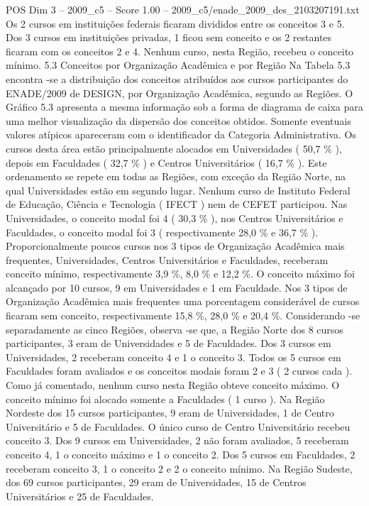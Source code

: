 \begin{textsample}{POS Dim 3 – 2009\_c5 – Score 1.00 – 2009\_c5/enade\_2009\_des\_2103207191.txt}
Os 2 cursos em instituições federais ficaram divididos entre os conceitos 3 e 5.
Dos 3 cursos em instituições privadas, 1 ficou sem conceito e os 2 restantes ficaram com os conceitos 2 e 4.
Nenhum curso, nesta Região, recebeu o conceito mínimo. 5.3 Conceitos por Organização Acadêmica e por Região Na Tabela 5.3 encontra -se a distribuição dos conceitos atribuídos aos cursos participantes do ENADE/2009 de DESIGN, por Organização Acadêmica, segundo as Regiões.
O Gráfico 5.3 apresenta a mesma informação sob a forma de diagrama de caixa para uma melhor visualização da dispersão dos conceitos obtidos.
Somente eventuais valores atípicos apareceram com o identificador da Categoria Administrativa.
Os cursos desta área estão principalmente alocados em Universidades ( 50,7 \% ), depois em Faculdades ( 32,7 \% ) e Centros Universitários ( 16,7 \% ).
Este ordenamento se repete em todas as Regiões, com exceção da Região Norte, na qual Universidades estão em segundo lugar.
Nenhum curso de Instituto Federal de Educação, Ciência e Tecnologia ( IFECT ) nem de CEFET participou.
Nas Universidades, o conceito modal foi 4 ( 30,3 \% ), nos Centros Universitários e Faculdades, o conceito modal foi 3 ( respectivamente 28,0 \% e 36,7 \% ).
Proporcionalmente poucos cursos nos 3 tipos de Organização Acadêmica mais frequentes, Universidades, Centros Universitários e Faculdades, receberam conceito mínimo, respectivamente 3,9 \%, 8,0 \% e 12,2 \%.
O conceito máximo foi alcançado por 10 cursos, 9 em Universidades e 1 em Faculdade.
Nos 3 tipos de Organização Acadêmica mais frequentes uma porcentagem considerável de cursos ficaram sem conceito, respectivamente 15,8 \%, 28,0 \% e 20,4 \%.
Considerando -se separadamente as cinco Regiões, observa -se que, a Região Norte dos 8 cursos participantes, 3 eram de Universidades e 5 de Faculdades.
Dos 3 cursos em Universidades, 2 receberam conceito 4 e 1 o conceito 3.
Todos os 5 cursos em Faculdades foram avaliados e os conceitos modais foram 2 e 3 ( 2 cursos cada ).
Como já comentado, nenhum curso nesta Região obteve conceito máximo.
O conceito mínimo foi alocado somente a Faculdades ( 1 curso ).
Na Região Nordeste dos 15 cursos participantes, 9 eram de Universidades, 1 de Centro Universitário e 5 de Faculdades.
O único curso de Centro Universitário recebeu conceito 3.
Dos 9 cursos em Universidades, 2 não foram avaliados, 5 receberam conceito 4, 1 o conceito máximo e 1 o conceito 2.
Dos 5 cursos em Faculdades, 2 receberam conceito 3, 1 o conceito 2 e 2 o conceito mínimo.
Na Região Sudeste, dos 69 cursos participantes, 29 eram de Universidades, 15 de Centros Universitários e 25 de Faculdades.

\end{textsample}
